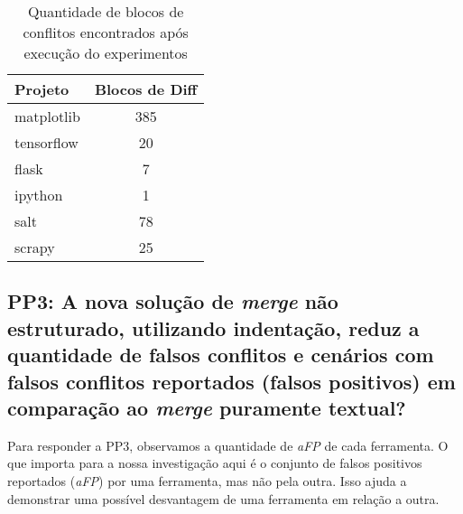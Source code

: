 \begin{table}[ht]
	\begin{center}
		\begin{tabular}{|l|c|}
			\hline
			\textbf{Projeto} & \textbf{Blocos de Diff} \\
			\hline
			matplotlib       & 385                     \\
			tensorflow       & 20                      \\
			flask            & 7                       \\
			ipython          & 1                       \\
			salt             & 78                      \\
			scrapy           & 25                      \\
			\hline
		\end{tabular}
	\end{center}
	\caption{Quantidade de blocos de conflitos encontrados após execução do
		experimentos}\label{block_diff}
\end{table}

\subsection{PP3: A nova solução de \emph{merge} não estruturado, utilizando
	indentação, reduz a quantidade de falsos conflitos e cenários com falsos
	conflitos reportados (falsos positivos) em comparação ao \emph{merge} puramente
	textual?}

Para responder a PP3, observamos a quantidade de \emph{aFP} de cada ferramenta.
O que importa para a nossa investigação aqui é o conjunto de falsos positivos
reportados (\emph{aFP}) por uma ferramenta, mas não pela outra. Isso ajuda a
demonstrar uma possível desvantagem de uma ferramenta em relação a outra.

